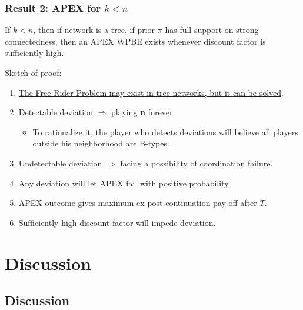 \documentclass[9pt]{beamer}
\begin{document}
\begin{frame}
\frametitle{Result 2: APEX for $k<n$}
\begin{theorem}[\alert{$k< n$}]
If $k<n$, then if network is a \alert{tree}, if prior $\pi$ has \alert{full support on strong connectedness}, then an APEX WPBE {exists} whenever discount factor is sufficiently high.
\end{theorem}

Sketch of proof:
\begin{enumerate}
\item \underline{The Free Rider Problem may exist in tree networks, but it can be solved}.
\item Detectable deviation $\Rightarrow$ playing \textbf{n} forever.
\begin{itemize}
\item To rationalize it, the player who detects deviations will believe all players outside his neighborhood are B-types.
\end{itemize}
\item Undetectable deviation $\Rightarrow$ facing a possibility of coordination failure.
\item Any deviation will let APEX fail with positive probability.
\item APEX outcome gives maximum ex-post continuation pay-off after $T$.
\item Sufficiently high discount factor will impede deviation.
\end{enumerate}



\end{frame}


\section{Discussion}
\subsection{Discussion}
\end{document}

